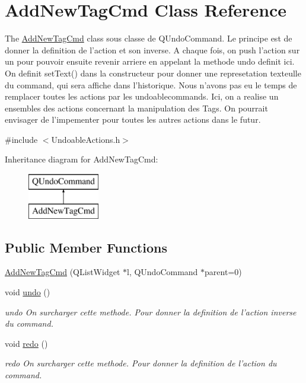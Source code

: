 \hypertarget{class_add_new_tag_cmd}{\section{Add\-New\-Tag\-Cmd Class Reference}
\label{class_add_new_tag_cmd}
}


The \hyperlink{class_add_new_tag_cmd}{Add\-New\-Tag\-Cmd} class sous classe de Q\-Undo\-Command. Le principe est de donner la definition de l'action et son inverse. A chaque fois, on push l'action sur un  pour pouvoir ensuite revenir arriere en appelant la methode undo definit ici. On definit set\-Text() dans la constructeur pour donner une represetation texteulle du command, qui sera affiche dans l'historique. Nous n'avons pas eu le temps de remplacer toutes les actions par les undoablecommands. Ici, on a realise un ensembles des actions concernant la manipulation des Tags. On pourrait envisager de l'impementer pour toutes les autres actions dans le futur.  




{\ttfamily \#include $<$Undoable\-Actions.\-h$>$}

Inheritance diagram for Add\-New\-Tag\-Cmd\-:\begin{figure}[H]
\begin{center}
\leavevmode
\includegraphics[height=2.000000cm]{class_add_new_tag_cmd}
\end{center}
\end{figure}
\subsection*{Public Member Functions}
\begin{DoxyCompactItemize}
\item 
\hyperlink{class_add_new_tag_cmd_a2c80fcee132cbfbc3f3061dce5cab809}{Add\-New\-Tag\-Cmd} (Q\-List\-Widget $\ast$l, Q\-Undo\-Command $\ast$parent=0)
\item 
void \hyperlink{class_add_new_tag_cmd_ad1f55a6c870c8f428bb40c89a7861b35}{undo} ()
\begin{DoxyCompactList}\small\item\em undo On surcharger cette methode. Pour donner la definition de l'action inverse du command. \end{DoxyCompactList}\item 
void \hyperlink{class_add_new_tag_cmd_a93b95bc95af1e2f925e625d5b231fd06}{redo} ()
\begin{DoxyCompactList}\small\item\em redo On surcharger cette methode. Pour donner la definition de l'action du command. \end{DoxyCompactList}\end{DoxyCompactItemize}



